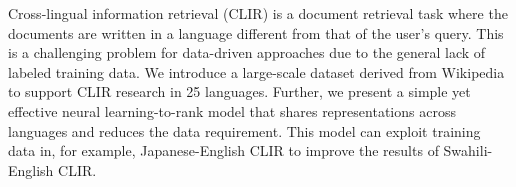 Cross-lingual information retrieval (CLIR) is a document retrieval task where the documents are written in a language different from that of the user's query. This is a challenging problem for data-driven approaches due to the general lack of labeled training data. We introduce a large-scale dataset derived from Wikipedia to support CLIR research in 25 languages.  Further, we present a simple yet effective neural learning-to-rank model that shares representations across languages and reduces the data requirement. This model can exploit training data in, for example, Japanese-English CLIR to improve the results of Swahili-English CLIR.
